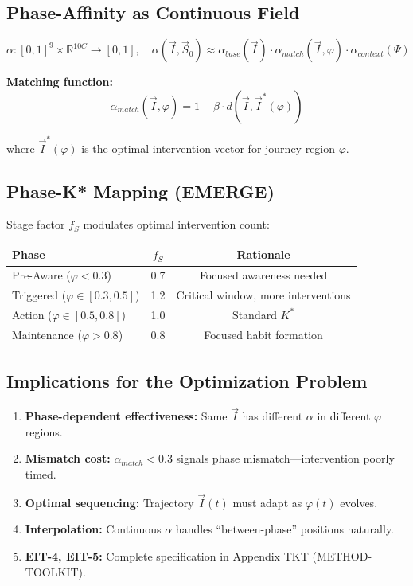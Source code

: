 \subsection{Phase-Affinity as Continuous Field}

\begin{equation}
\boxed{
\alpha: [0,1]^9 \times \mathbb{R}^{10C} \to [0,1], \quad \alpha(\vec{I}, \vec{S}_0) \approx \alpha_{base}(\vec{I}) \cdot \alpha_{match}(\vec{I}, \varphi) \cdot \alpha_{context}(\Psi)
}
\label{eq:mp-phase-affinity}
\end{equation}

\textbf{Matching function:}
\begin{equation}
\alpha_{match}(\vec{I}, \varphi) = 1 - \beta \cdot d(\vec{I}, \vec{I}^*(\varphi))
\label{eq:mp-matching}
\end{equation}

where $\vec{I}^*(\varphi)$ is the optimal intervention vector for journey region $\varphi$.

\subsection{Phase-K* Mapping (EMERGE)}

Stage factor $f_S$ modulates optimal intervention count:

\begin{center}
\renewcommand{\arraystretch}{1.2}
\begin{tabular}{@{}lcc@{}}
\toprule
\textbf{Phase} & \textbf{$f_S$} & \textbf{Rationale} \\
\midrule
Pre-Aware ($\varphi < 0.3$) & 0.7 & Focused awareness needed \\
Triggered ($\varphi \in [0.3, 0.5]$) & 1.2 & Critical window, more interventions \\
Action ($\varphi \in [0.5, 0.8]$) & 1.0 & Standard $K^*$ \\
Maintenance ($\varphi > 0.8$) & 0.8 & Focused habit formation \\
\bottomrule
\end{tabular}
\end{center}

\subsection{Implications for the Optimization Problem}

\begin{enumerate}[nosep]
\item \textbf{Phase-dependent effectiveness:} Same $\vec{I}$ has different $\alpha$ in different $\varphi$ regions.
\item \textbf{Mismatch cost:} $\alpha_{match} < 0.3$ signals phase mismatch---intervention poorly timed.
\item \textbf{Optimal sequencing:} Trajectory $\vec{I}(t)$ must adapt as $\varphi(t)$ evolves.
\item \textbf{Interpolation:} Continuous $\alpha$ handles ``between-phase'' positions naturally.
\item \textbf{EIT-4, EIT-5:} Complete specification in Appendix TKT (METHOD-TOOLKIT).
\end{enumerate}

